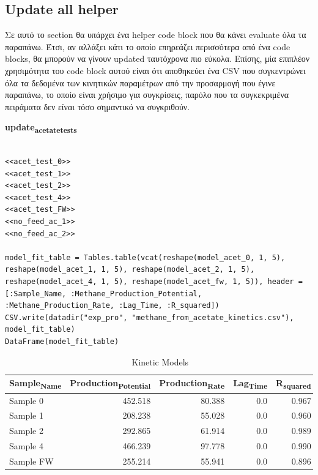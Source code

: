\documentclass[11pt]{article}
\begin{document}
\subsection{Update all helper}
\label{sec:org231e4fb}
Σε αυτό το section θα υπάρχει ένα helper code block που θα κάνει evaluate όλα τα παραπάνω. Έτσι, αν αλλάξει κάτι το οποίο επηρεάζει περισσότερα από ένα code blocks, θα μπορούν να γίνουν updated ταυτόχρονα πιο εύκολα. Επίσης, μία επιπλέον χρησιμότητα του code block αυτού είναι ότι αποθηκεύει ένα CSV που συγκεντρώνει όλα τα δεδομένα των κινητικών παραμέτρων από την προσαρμογή που έγινε παραπάνω, το οποίο είναι χρήσιμο για συγκρίσεις, παρόλο που τα συγκεκριμένα πειράματα δεν είναι τόσο σημαντικό να συγκριθούν.

\textbf{update\textsubscript{acetate}\textsubscript{tests}}
\begin{verbatim}

<<acet_test_0>>
<<acet_test_1>>
<<acet_test_2>>
<<acet_test_4>>
<<acet_test_FW>>
<<no_feed_ac_1>>
<<no_feed_ac_2>>

model_fit_table = Tables.table(vcat(reshape(model_acet_0, 1, 5), reshape(model_acet_1, 1, 5), reshape(model_acet_2, 1, 5), reshape(model_acet_4, 1, 5), reshape(model_acet_fw, 1, 5)), header = [:Sample_Name, :Methane_Production_Potential, :Methane_Production_Rate, :Lag_Time, :R_squared])
CSV.write(datadir("exp_pro", "methane_from_acetate_kinetics.csv"), model_fit_table)
DataFrame(model_fit_table)

\end{verbatim}

\begin{table}[htbp]
\caption{Kinetic Models}
\centering
\begin{tabular}{lrrrr}
Sample\textsubscript{Name} & Production\textsubscript{Potential} & Production\textsubscript{Rate} & Lag\textsubscript{Time} & R\textsubscript{squared}\\[0pt]
\hline
Sample 0 & 452.518 & 80.388 & 0.0 & 0.967\\[0pt]
Sample 1 & 208.238 & 55.028 & 0.0 & 0.960\\[0pt]
Sample 2 & 292.865 & 61.914 & 0.0 & 0.989\\[0pt]
Sample 4 & 466.239 & 97.778 & 0.0 & 0.990\\[0pt]
Sample FW & 255.214 & 55.941 & 0.0 & 0.896\\[0pt]
\end{tabular}
\end{table}
\end{document}
